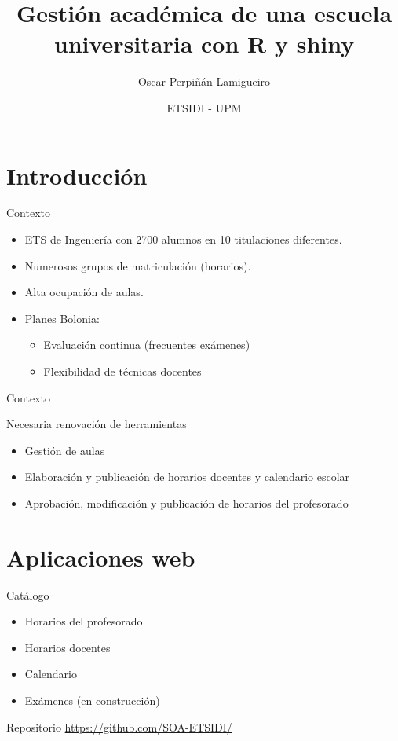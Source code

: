 \documentclass[spanish, xcolor={usenames,svgnames,dvipsnames}]{beamer}
\author{Oscar Perpiñán Lamigueiro}
\date{ETSIDI - UPM}
\title{Gestión académica de una escuela universitaria con R y shiny}
\begin{document}
\maketitle

\section{Introducción}
\label{sec:org759568f}

\begin{frame}[label={sec:org6e3776a}]{Contexto}
\begin{itemize}
\item ETS de Ingeniería con 2700 alumnos en 10 titulaciones diferentes.
\item Numerosos grupos de matriculación (horarios).
\item Alta ocupación de aulas.
\item Planes Bolonia:
\begin{itemize}
\item Evaluación continua (frecuentes exámenes)
\item Flexibilidad de técnicas docentes
\end{itemize}
\end{itemize}
\end{frame}

\begin{frame}[label={sec:orgd62443a}]{Contexto}
\begin{block}{Necesaria renovación de herramientas}
\begin{itemize}
\item Gestión de aulas
\item Elaboración y publicación de horarios docentes y calendario escolar
\item Aprobación, modificación y publicación de horarios del profesorado
\end{itemize}
\end{block}
\end{frame}


\section{Aplicaciones web}
\label{sec:org54e3eec}

\begin{frame}[label={sec:orgdb900a7}]{Catálogo}
\begin{itemize}
\item Horarios del profesorado
\item Horarios docentes
\item Calendario
\item Exámenes (en construcción)
\end{itemize}

\begin{block}{Repositorio}
\url{https://github.com/SOA-ETSIDI/}
\end{block}
\end{frame}
\end{document}
